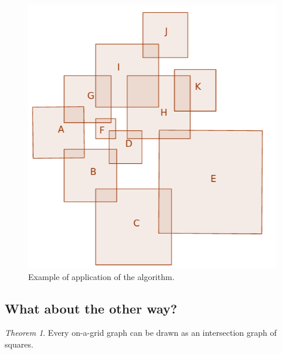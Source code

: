 \documentclass[12pt]{article}
\theoremstyle{definition}
\theoremstyle{remark}
\newtheorem{theorem}{Theorem}[section]
\begin{document}
\begin{figure}[h]
    \centering
    \includegraphics[scale=0.3]{tex_images/example_algorithm.png}  
    \caption{Example of application of the algorithm.}  
\end{figure}











\subsection{What about the other way?}


\begin{theorem}
    Every on-a-grid graph can be drawn as an intersection graph of squares. 
\end{theorem}
\end{document}
